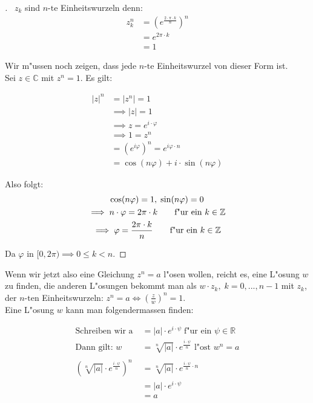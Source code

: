 \documentclass[11pt]{article}
\begin{document}
\begin{proof}[] \label{} \
\(z_k\) sind \(n\text{-te}\) Einheitswurzeln denn:
\begin{align*}
z_k^n & = (e^{\frac{2\cdot\pi\cdot k}{n}})^n \\ 
& = e^{2\pi\cdot k} \\
& = 1
\end{align*}


Wir m"ussen noch zeigen, dass jede \(n\text{-te}\) Einheitswurzel von dieser Form
ist. \\

Sei \(z\in\mathbb{C}\) mit \(z^n=1\). Es gilt:

\begin{align*}
|z|^n & =|z^n|=1 \\
& \implies |z|=1  \\
& \implies z=e^{i\cdot\varphi} \tag*{f"ur ein $\varphi\in[0, 2\pi)$}  \\ 
& \implies 1 = z^n \\
& = (e^{i\varphi})^n=e^{i\varphi\cdot n} \\
& =\cos(n\varphi)+i\cdot \sin(n\varphi)
\end{align*}

Also folgt:
\begin{gather*}
\cos(n\varphi)=1,\;\sin(n\varphi)=0 \\
\implies  n\cdot\varphi = 2\pi\cdot k \tag*{f"ur ein $k\in \mathbb{Z}$} \\ 
 \implies \varphi = \frac{2\pi\cdot k}{n} \tag*{f"ur ein $k\in \mathbb{Z}$}
\end{gather*}


Da \(\varphi\) in \([0,2\pi)\implies 0\leq k < n\).
\end{proof}

Wenn wir jetzt also eine Gleichung \(z^n=a\) l"osen wollen, reicht es, eine
L"osung \(w\) zu finden, die anderen L"osungen bekommt man als \(w\cdot z_k,\;
k=0,...,n-1\) mit \(z_k\), der \(n\text{-ten}\) Einheitswurzeln: \(z^n=a\iff
(\frac{z}{w})^n=1\).\\

Eine L"osung \(w\) kann man folgendermassen finden:
\begin{relation}


\begin{align*} 
\text{Schreiben wir a}\; & =|a|\cdot e^{i\cdot \psi}\; \text{f"ur ein $\psi\in \mathbb{R}$} \\
\text{Dann gilt: }
w & =\sqrt[n]{|a|}\cdot e^{\frac{i\cdot\psi}{n}} \text{ l"ost $w^n=a$} \\
& \\
\left(\sqrt[n]{|a|}\cdot e^{\frac{i\cdot\psi}{n}}\right)^n & = \sqrt[n]{|a|}\cdot e^{\frac{i\cdot\psi}{n}\cdot n} \\
& = |a|\cdot e^{i\cdot \psi} \\ 
& = a
\end{align*}
\end{relation}
\end{document}
